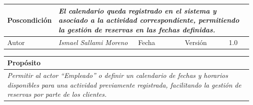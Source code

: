 \begin{table}[H]
\begin{tabular}{llllllll}
        \multicolumn{1}{|l|}{Poscondición}                           & \multicolumn{7}{p{10cm}|}{{\color[HTML]{808080} \textit{El calendario queda registrado en el sistema y asociado a la actividad correspondiente, permitiendo la gestión de reservas en las fechas definidas.}}}                                                                                                                                                                                                                                                       \\ \hline
        \multicolumn{1}{|l|}{Autor}                                  & \multicolumn{1}{l|}{{\color[HTML]{808080} \textit{Ismael Sallami Moreno}}}                           & \multicolumn{2}{l|}{Fecha}                                                   & \multicolumn{1}{l|}{}                          & \multicolumn{2}{l|}{Versión}                                                      & \multicolumn{1}{l|}{1.0}                                                     \\ \hline
        \end{tabular}
    \end{table}

    \begin{table}[H]
        \begin{tabular}{llllllll}
    \hline
    \multicolumn{8}{|l|}{\cellcolor[HTML]{F2F2F2}Propósito}                                                                                                                                                                                                                                                                                                                                                                                           \\ \hline
    \multicolumn{8}{|p{15cm}|}{{\color[HTML]{808080} \textit{Permitir al actor “Empleado” o definir un calendario de fechas y horarios disponibles para una actividad previamente registrada, facilitando la gestión de reservas por parte de los clientes.}}}                                                                                                                                                                                                             \\ \hline
    \end{tabular}
    \end{table}

